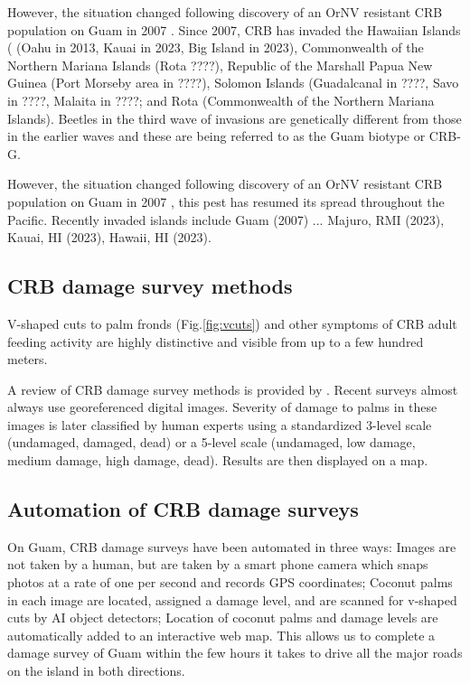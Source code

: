 \documentclass[11pt,english,letterpaper]{scrartcl}
\begin{document}

However, the situation changed following discovery of an OrNV resistant CRB population on Guam in 2007 \cite{Marshall2017}. Since 2007, CRB has invaded the Hawaiian Islands ( (Oahu in 2013, Kauai in 2023, Big Island in 2023), Commonwealth of the Northern Mariana Islands (Rota ????), Republic of the Marshall Papua New Guinea (Port Morseby area in ????), Solomon Islands (Guadalcanal in ????, Savo in ????, Malaita in ????; and Rota (Commonwealth of the Northern Mariana Islands). Beetles in the third wave of invasions are genetically different from those in the earlier waves and these are being referred to as the Guam biotype or CRB-G.



However, the situation changed following discovery of an OrNV resistant CRB population on Guam in 2007 \cite{Marshall2017}, this pest has resumed its spread throughout the Pacific. Recently invaded islands include Guam (2007) ... Majuro, RMI (2023), Kauai, HI (2023), Hawaii, HI (2023).

\subsection{CRB damage survey methods}

V-shaped cuts to palm fronds (Fig.\ref{fig:vcuts}) and other symptoms of CRB adult feeding activity are highly distinctive and visible from up to a few hundred meters.

A review of CRB damage survey methods is provided by \cite{Mansfield2023}. Recent surveys almost always use georeferenced digital images. Severity of damage to palms in these images is later classified by human experts using a standardized 3-level scale (undamaged, damaged, dead) or a 5-level scale (undamaged, low damage, medium damage, high damage, dead). Results are then displayed on a map. 

\subsection{Automation of CRB damage surveys}

On Guam, CRB damage surveys have been automated in three ways:
Images are not taken by a human, but are taken by a smart phone camera which snaps photos at a rate of one per second and records GPS coordinates;
Coconut palms in each image are located, assigned a damage level, and are scanned for v-shaped cuts by AI object detectors;
Location of coconut palms and damage levels are automatically added to an interactive web map.
This allows us to complete a damage survey of Guam within the few hours it takes to drive all the major roads on the island in both directions.
\end{document}

